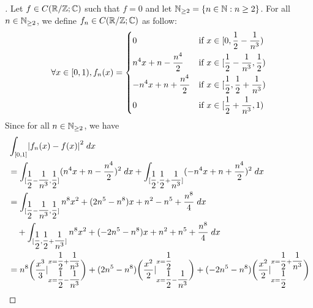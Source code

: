 \begin{proof}[]
  Let \(f \in C(\mathbb{R} / \mathbb{Z} ; \mathbb{C})\) such that \(f = 0\) and let \(\mathbb{N}_{\geq 2} = \left\lbrace n \in \mathbb{N} : n \geq 2\right\rbrace\).
  For all \(n \in \mathbb{N}_{\geq 2}\), we define \(f_n \in C(\mathbb{R} / \mathbb{Z} ; \mathbb{C})\) as follow:
  \[
    \forall x \in [0, 1), f_n(x) = \begin{dcases}
      0                           & \text{if } x \in [0, \dfrac{1}{2} - \dfrac{1}{n^3})            \\
      n^4 x + n - \dfrac{n^4}{2}  & \text{if } x \in [\dfrac{1}{2} - \dfrac{1}{n^3}, \dfrac{1}{2}) \\
      -n^4 x + n + \dfrac{n^4}{2} & \text{if } x \in [\dfrac{1}{2}, \dfrac{1}{2} + \dfrac{1}{n^3}) \\
      0                           & \text{if } x \in [\dfrac{1}{2} + \dfrac{1}{n^3}, 1)
    \end{dcases}
  \]
  Since for all \(n \in \mathbb{N}_{\geq 2}\), we have
  \begin{align*}
     & \int_{[0, 1]} \abs{f_n(x) - f(x)}^2 \; dx                                                                                                                                                                                                                                                                      \\
     & = \int_{[\dfrac{1}{2} - \dfrac{1}{n^3}, \dfrac{1}{2}]} (n^4 x + n - \dfrac{n^4}{2})^2 \; dx + \int_{[\dfrac{1}{2}, \dfrac{1}{2} + \dfrac{1}{n^3}]} (-n^4 x + n + \dfrac{n^4}{2})^2 \; dx                                                                                                                       \\
     & = \int_{[\dfrac{1}{2} - \dfrac{1}{n^3}, \dfrac{1}{2}]} n^8 x^2 + (2n^5 - n^8) x + n^2 - n^5 + \dfrac{n^8}{4} \; dx                                                                                                                                                                                             \\
     & \quad + \int_{[\dfrac{1}{2}, \dfrac{1}{2} + \dfrac{1}{n^3}]} n^8 x^2 + (-2n^5 - n^8) x + n^2 + n^5 + \dfrac{n^8}{4} \; dx                                                                                                                                                                                      \\
     & = n^8 \bigg(\dfrac{x^3}{3}|_{x = \dfrac{1}{2} - \dfrac{1}{n^3}}^{x = \dfrac{1}{2} + \dfrac{1}{n^3}}\bigg) + (2n^5 - n^8) \bigg(\dfrac{x^2}{2}|_{x = \dfrac{1}{2} - \dfrac{1}{n^3}}^{x = \dfrac{1}{2}}\bigg) + (-2n^5 - n^8) \bigg(\dfrac{x^2}{2}|_{x = \dfrac{1}{2}}^{x = \dfrac{1}{2} + \dfrac{1}{n^3}}\bigg) \\

\end{align*}
\end{proof}
